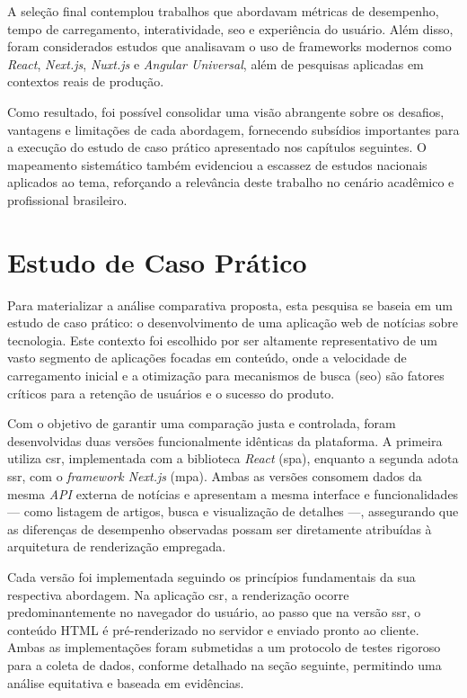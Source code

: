 A seleção final contemplou trabalhos que abordavam métricas de desempenho, tempo de carregamento, interatividade, \acrshort{seo} e experiência do usuário. Além disso, foram considerados estudos que analisavam o uso de frameworks modernos como \textit{React}, \textit{Next.js}, \textit{Nuxt.js} e \textit{Angular Universal}, além de pesquisas aplicadas em contextos reais de produção.

Como resultado, foi possível consolidar uma visão abrangente sobre os desafios, vantagens e limitações de cada abordagem, fornecendo subsídios importantes para a execução do estudo de caso prático apresentado nos capítulos seguintes. O mapeamento sistemático também evidenciou a escassez de estudos nacionais aplicados ao tema, reforçando a relevância deste trabalho no cenário acadêmico e profissional brasileiro.


\section{Estudo de Caso Prático}
\label{sec:estudo-de-caso-pratico}

Para materializar a análise comparativa proposta, esta pesquisa se baseia em um estudo de caso prático: o desenvolvimento de uma aplicação web de notícias sobre tecnologia. Este contexto foi escolhido por ser altamente representativo de um vasto segmento de aplicações focadas em conteúdo, onde a velocidade de carregamento inicial e a otimização para mecanismos de busca (\acrshort{seo}) são fatores críticos para a retenção de usuários e o sucesso do produto.

Com o objetivo de garantir uma comparação justa e controlada, foram desenvolvidas duas versões funcionalmente idênticas da plataforma. A primeira utiliza \acrfull{csr}, implementada com a biblioteca \textit{React} (\acrshort{spa}), enquanto a segunda adota \acrfull{ssr}, com o \textit{framework Next.js} (\acrshort{mpa}). Ambas as versões consomem dados da mesma \textit{API} externa de notícias e apresentam a mesma interface e funcionalidades — como listagem de artigos, busca e visualização de detalhes —, assegurando que as diferenças de desempenho observadas possam ser diretamente atribuídas à arquitetura de renderização empregada.

Cada versão foi implementada seguindo os princípios fundamentais da sua respectiva abordagem. Na aplicação \acrshort{csr}, a renderização ocorre predominantemente no navegador do usuário, ao passo que na versão \acrshort{ssr}, o conteúdo HTML é pré-renderizado no servidor e enviado pronto ao cliente. Ambas as implementações foram submetidas a um protocolo de testes rigoroso para a coleta de dados, conforme detalhado na seção seguinte, permitindo uma análise equitativa e baseada em evidências.


